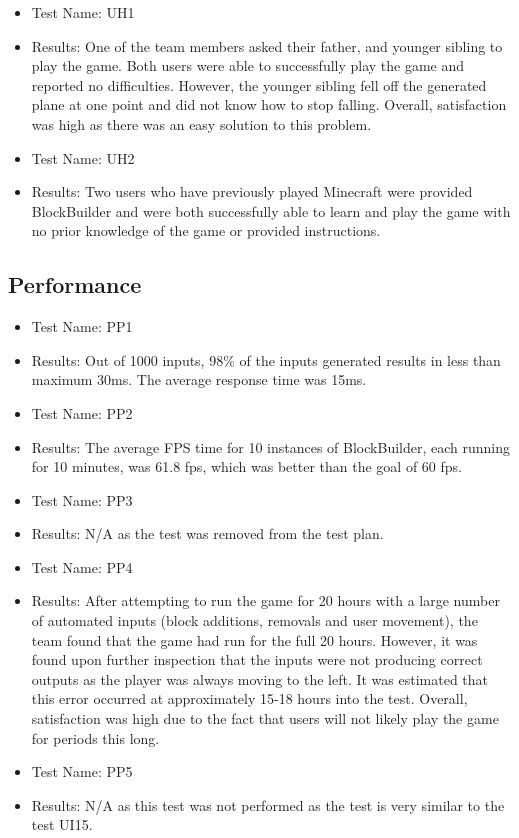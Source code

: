 \documentclass[12pt, titlepage]{article}
\begin{document}
\begin{itemize}
    \item[] Test Name: UH1
    \item[] Results: One of the team members asked their father, and younger sibling to play the game. Both users were able to successfully play the game and reported no difficulties. However, the younger sibling fell off the generated plane at one point and did not know how to stop falling. Overall, satisfaction was high as there was an easy solution to this problem.
    \item[] Test Name: UH2
    \item[] Results: Two users who have previously played Minecraft were provided BlockBuilder and were both successfully able to learn and play the game with no prior knowledge of the game or provided instructions.
\end{itemize}

\subsection{Performance}

\begin{itemize}
    \item[] Test Name: PP1
    \item[] Results: Out of 1000 inputs, 98\% of the inputs generated results in less than maximum 30ms. The average response time was 15ms.
    \item[] Test Name: PP2
    \item[] Results: The average FPS time for 10 instances of BlockBuilder, each running for 10 minutes, was 61.8 fps, which was better than the goal of 60 fps. 
    \item[] Test Name: PP3
    \item[] Results: N/A as the test was removed from the test plan.
    \item[] Test Name: PP4
    \item[] Results: After attempting to run the game for 20 hours with a large number of automated inputs (block additions, removals and user movement), the team found that the game had run for the full 20 hours. However, it was found upon further inspection that the inputs were not producing correct outputs as the player was always moving to the left. It was estimated that this error occurred at approximately 15-18 hours into the test. Overall, satisfaction was high due to the fact that users will not likely play the game for periods this long. 
    \item[] Test Name: PP5
    \item[] Results: N/A as this test was not performed as the test is very similar to the test UI15.
\end{itemize}
\end{document}
